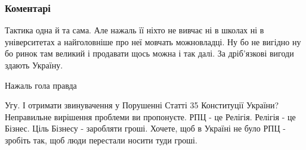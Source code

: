  
 
 
 
 
\subsubsection{Коментарі}
\label{sec:31_07_2021.fb.mischenko_andrej.1.cerkov_upc_moskovia.cmt}

\begin{itemize}
 

Тактика одна й та сама. Але нажаль її ніхто не вивчає ні в школах ні в
університетах а найголовніше про неї мовчать можновладці. Ну бо не вигідно ну
бо ринок там великий і продавати щось можна і так далі. За дріб’язкові вигоди
здають Україну.


 
Нажаль гола правда

 

Угу. І отримати звинувачення у Порушенні Статті 35 Конституції України?
Неправильне вирішення проблеми ви пропонуєте. РПЦ - це Релігія. Релігія - це
Бізнес. Ціль Бізнесу - заробляти гроші. Хочете, щоб в Україні не було РПЦ -
зробіть так, щоб люди перестали носити туди гроші.

\begin{itemize}
 

\end{itemize}
\end{itemize}
